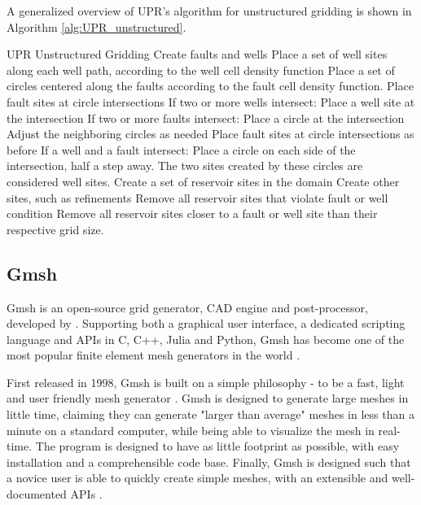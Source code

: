 A generalized overview of UPR's algorithm for unstructured gridding \cite[pp.51]{UPR_thesis} is shown in Algorithm \ref{alg:UPR_unstructured}.
\begin{pseudocode}[float=ht,label=alg:UPR_unstructured]{UPR Unstructured Gridding}
Create faults and wells
    Place a set of well sites along each well path, according to the well cell density function
    Place a set of circles centered along the faults according to the fault cell density function. Place fault sites at circle intersections
    If two or more wells intersect:
        Place a well site at the intersection
    If two or more faults intersect:
        Place a circle at the intersection
        Adjust the neighboring circles as needed
        Place fault sites at circle intersections as before
    If a well and a fault intersect:
        Place a circle on each side of the intersection, half a step away. The two sites created by these circles are considered well sites.
Create a set of reservoir sites in the domain
Create other sites, such as refinements
Remove all reservoir sites that violate fault or well condition
Remove all reservoir sites closer to a fault or well site than their respective grid size.
\end{pseudocode}

\subsection{Gmsh}
\label{sec:Gmsh}
Gmsh is an open-source grid generator, CAD engine and post-processor, developed by \textcite{Gmsh_article}. Supporting both a graphical user interface, a dedicated scripting language and APIs in C, C++, Julia and Python, Gmsh has become one of the most popular finite element mesh generators in the world \cite{Gmsh_presentation}.

First released in 1998, Gmsh is built on a simple philosophy - to be a fast, light and user friendly mesh generator \cite{Gmsh_article}. Gmsh is designed to generate large meshes in little time, claiming they can generate "larger than average" meshes in less than a minute on a standard computer, while being able to visualize the mesh in real-time. The program is designed to have as little footprint as possible, with easy installation and a comprehensible code base. Finally, Gmsh is designed such that a novice user is able to quickly create simple meshes, with an extensible and well-documented APIs \cite{Gmsh_presentation}.

